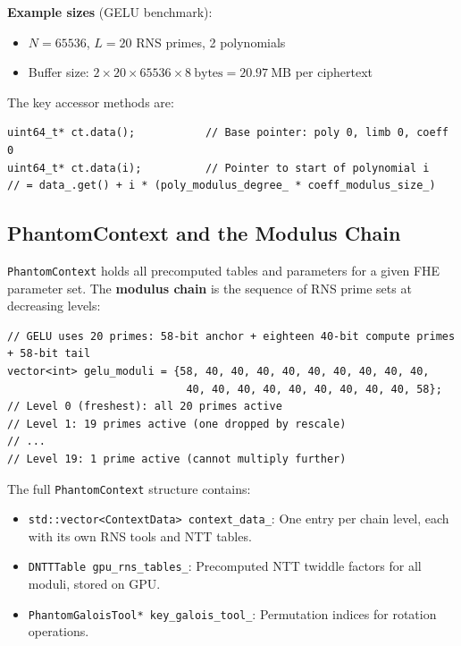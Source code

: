 \documentclass[11pt,letterpaper]{article}
\begin{document}
\textbf{Example sizes} (GELU benchmark):
\begin{itemize}
  \item $N = 65536$, $L = 20$ RNS primes, 2 polynomials
  \item Buffer size: $2 \times 20 \times 65536 \times 8\ \text{bytes} = 20.97\ \text{MB}$ per ciphertext
\end{itemize}

The key accessor methods are:
\begin{lstlisting}[style=cpp, caption=Accessing ciphertext data pointers]
uint64_t* ct.data();           // Base pointer: poly 0, limb 0, coeff 0
uint64_t* ct.data(i);          // Pointer to start of polynomial i
// = data_.get() + i * (poly_modulus_degree_ * coeff_modulus_size_)
\end{lstlisting}

\subsection{PhantomContext and the Modulus Chain}

\texttt{PhantomContext} holds all precomputed tables and parameters for a given FHE parameter
set. The \textbf{modulus chain} is the sequence of RNS prime sets at decreasing levels:

\begin{lstlisting}[style=cpp, caption=Modulus chain for GELU benchmark (main.cu)]
// GELU uses 20 primes: 58-bit anchor + eighteen 40-bit compute primes + 58-bit tail
vector<int> gelu_moduli = {58, 40, 40, 40, 40, 40, 40, 40, 40, 40,
                            40, 40, 40, 40, 40, 40, 40, 40, 40, 58};
// Level 0 (freshest): all 20 primes active
// Level 1: 19 primes active (one dropped by rescale)
// ...
// Level 19: 1 prime active (cannot multiply further)
\end{lstlisting}

The full \texttt{PhantomContext} structure contains:
\begin{itemize}
  \item \texttt{std::vector<ContextData> context\_data\_}: One entry per chain level, each with its own RNS tools and NTT tables.
  \item \texttt{DNTTTable gpu\_rns\_tables\_}: Precomputed NTT twiddle factors for all moduli, stored on GPU.
  \item \texttt{PhantomGaloisTool* key\_galois\_tool\_}: Permutation indices for rotation operations.
\end{itemize}
\end{document}
